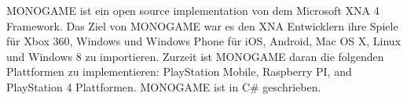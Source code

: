 MONOGAME ist ein open source implementation von dem Microsoft XNA 4 Framework. Das Ziel von MONOGAME war es den XNA Entwicklern ihre Spiele 
für Xbox 360, Windows und Windows Phone für iOS, Android, Mac OS X, Linux und Windows 8 zu importieren. Zurzeit ist MONOGAME daran die folgenden Plattformen zu implementieren: PlayStation Mobile, Raspberry PI, and PlayStation 4 Plattformen.
MONOGAME ist in C\# geschrieben. 